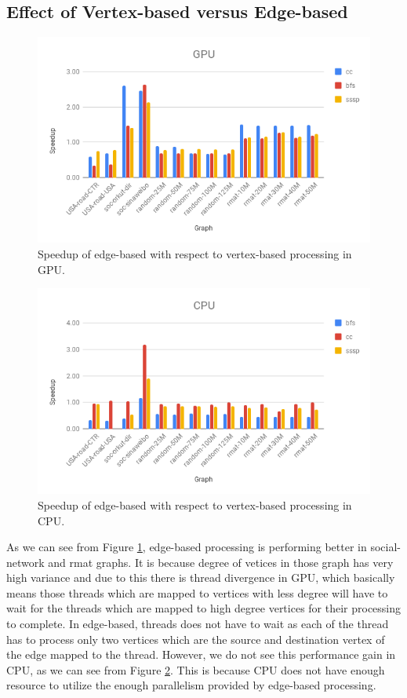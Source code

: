 \documentclass[12pt]{article}
\begin{document}
\subsection{Effect of Vertex-based versus Edge-based}\label{expt:vertexedge}
\begin{figure}
\centering
\includegraphics[width=0.7\linewidth]{GPU.png}
\caption{Speedup of edge-based with respect to vertex-based processing in GPU.}
\label{speedup:gpu}
\end{figure}
\begin{figure}
\centering
\includegraphics[width=0.7\linewidth]{CPU.png}
\caption{Speedup of edge-based with respect to vertex-based processing in CPU.}
\label{speedup:cpu}
\end{figure}

As we can see from Figure \ref{speedup:gpu}, edge-based processing is performing better in social-network and rmat graphs. It is because degree of vetices in those graph has very high variance and due to this there is thread divergence in GPU, which basically means those threads which are mapped to vertices with less degree will have to wait for the threads which are mapped to high degree vertices for their processing to complete. In edge-based, threads does not have to wait as each of the thread has to process only two vertices which are the source and destination vertex of the edge mapped to the thread. However, we do not see this performance gain in CPU, as we can see from Figure \ref{speedup:cpu}. This is because CPU does not have enough resource to utilize the enough parallelism provided by edge-based processing.
\end{document}
